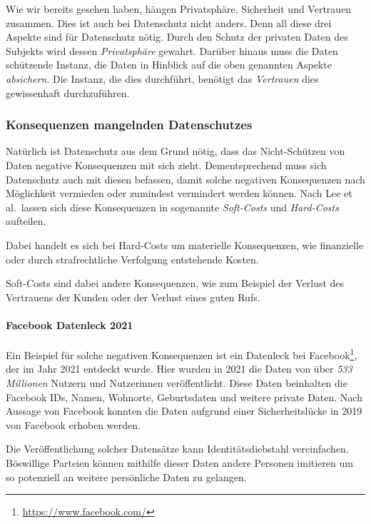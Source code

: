 Wie wir bereits gesehen haben, hängen Privatsphäre, Sicherheit und Vertrauen zusammen. 
Dies ist auch bei Datenschutz nicht anders. Denn all diese drei Aspekte sind für Datenschutz nötig.
Durch den Schutz der privaten Daten des Subjekts wird dessen \emph{Privatsphäre} gewahrt.
Darüber hinaus muss die Daten schützende Instanz, die Daten in Hinblick auf die oben genannten Aspekte \emph{absichern}.
Die Instanz, die dies durchführt, benötigt das \emph{Vertrauen} dies gewissenhaft durchzuführen.

\subsubsection{Konsequenzen mangelnden Datenschutzes}

Natürlich ist Datenschutz aus dem Grund nötig, dass das Nicht-Schützen von Daten negative Konsequenzen mit sich zieht.
Dementsprechend muss sich Datenschutz auch mit diesen befassen, damit solche negativen Konsequenzen nach Möglichkeit vermieden oder zumindest vermindert werden können.
Nach Lee et al.\ lassen sich diese Konsequenzen in sogenannte \emph{Soft-Costs} und \emph{Hard-Costs} aufteilen. \cite{lee_ethical_2016}

Dabei handelt es sich bei Hard-Costs um materielle Konsequenzen, wie finanzielle oder durch strafrechtliche Verfolgung entstehende Kosten.

Soft-Costs sind dabei andere Konsequenzen, wie zum Beispiel der Verlust des Vertrauens der Kunden oder der Verlust eines guten Rufs.

\paragraph*{Facebook Datenleck 2021}

Ein Beispiel für solche negativen Konsequenzen ist ein Datenleck bei Facebook\footnote{\url{https://www.facebook.com/}}, 
der im Jahr 2021 entdeckt wurde. \cite{holmes_533_2021}
Hier wurden in 2021 die Daten von über \emph{533 Millionen} Nutzern und Nutzerinnen veröffentlicht.
Diese Daten beinhalten die Facebook IDs, Namen, Wohnorte, Geburtsdaten und weitere private Daten.
Nach Aussage von Facebook konnten die Daten aufgrund einer Sicherheitslücke in 2019 von Facebook erhoben werden. \cite{clark_facts_2021}

Die Veröffentlichung solcher Datensätze kann Identitätsdiebstahl vereinfachen.
Böswillige Parteien können mithilfe dieser Daten andere Personen imitieren um so potenziell an weitere persönliche Daten zu gelangen.

